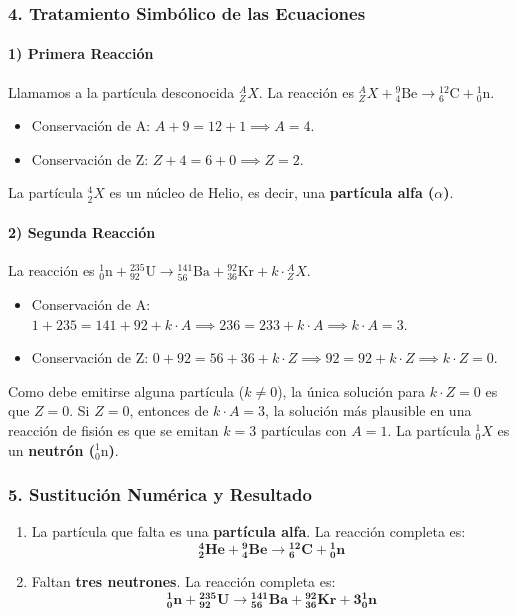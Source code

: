 \subsubsection*{4. Tratamiento Simbólico de las Ecuaciones}
\paragraph{1) Primera Reacción}
Llamamos a la partícula desconocida ${}_{Z}^{A}X$. La reacción es ${}_{Z}^{A}X + {}_{4}^{9}\text{Be} \to {}_{6}^{12}\text{C} + {}_{0}^{1}\text{n}$.
\begin{itemize}
    \item Conservación de A: $A + 9 = 12 + 1 \implies A = 4$.
    \item Conservación de Z: $Z + 4 = 6 + 0 \implies Z = 2$.
\end{itemize}
La partícula ${}_{2}^{4}X$ es un núcleo de Helio, es decir, una \textbf{partícula alfa ($\alpha$)}.

\paragraph{2) Segunda Reacción}
La reacción es ${}_{0}^{1}\text{n} + {}_{92}^{235}\text{U} \to {}_{56}^{141}\text{Ba} + {}_{36}^{92}\text{Kr} + k \cdot {}_{Z}^{A}X$.
\begin{itemize}
    \item Conservación de A: $1 + 235 = 141 + 92 + k \cdot A \implies 236 = 233 + k \cdot A \implies k \cdot A = 3$.
    \item Conservación de Z: $0 + 92 = 56 + 36 + k \cdot Z \implies 92 = 92 + k \cdot Z \implies k \cdot Z = 0$.
\end{itemize}
Como debe emitirse alguna partícula ($k \neq 0$), la única solución para $k \cdot Z = 0$ es que $Z=0$.
Si $Z=0$, entonces de $k \cdot A = 3$, la solución más plausible en una reacción de fisión es que se emitan $k=3$ partículas con $A=1$. La partícula ${}_{0}^{1}X$ es un \textbf{neutrón (${}_{0}^{1}\text{n}$)}.

\subsubsection*{5. Sustitución Numérica y Resultado}
\begin{cajaresultado}
\begin{enumerate}
    \item La partícula que falta es una \textbf{partícula alfa}. La reacción completa es:
    $$ \boldsymbol{{}_{2}^{4}\text{He} + {}_{4}^{9}\text{Be} \to {}_{6}^{12}\text{C} + {}_{0}^{1}\text{n}} $$
    \item Faltan \textbf{tres neutrones}. La reacción completa es:
    $$ \boldsymbol{{}_{0}^{1}\text{n} + {}_{92}^{235}\text{U} \to {}_{56}^{141}\text{Ba} + {}_{36}^{92}\text{Kr} + 3{}_{0}^{1}\text{n}} $$
\end{enumerate}
\end{cajaresultado}

